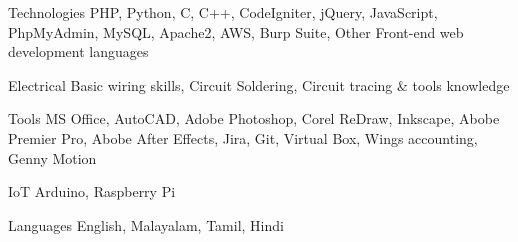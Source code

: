 

\begin{cvskills}

  \cvskill
    {Technologies} %
    {PHP, Python, C, C++, CodeIgniter, jQuery, JavaScript, PhpMyAdmin, MySQL, Apache2, AWS, Burp Suite, Other Front-end web development languages} %

  \cvskill
    {Electrical} %
    {Basic wiring skills, Circuit Soldering, Circuit tracing \& tools knowledge} %

  \cvskill
    {Tools} %
    {MS Office, AutoCAD, Adobe Photoshop, Corel ReDraw, Inkscape, Abobe Premier Pro, Abobe After Effects, Jira, Git, Virtual Box, Wings accounting, Genny Motion} %

  \cvskill
    {IoT} %
    {Arduino, Raspberry Pi} %

  \cvskill
    {Languages} %
    {English, Malayalam, Tamil, Hindi} %

\end{cvskills}